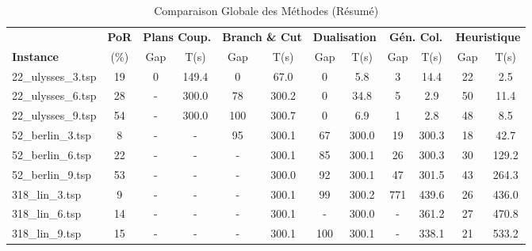 \begin{table}[H]
\centering
\caption{Comparaison Globale des Méthodes (Résumé)}
\scriptsize
\setlength{\tabcolsep}{3pt}
\begin{tabular}{|l|c||cc|cc|cc|cc|cc|}
\hline
 & \textbf{PoR} & \multicolumn{2}{c|}{\textbf{Plans Coup.}} & \multicolumn{2}{c|}{\textbf{Branch \& Cut}} & \multicolumn{2}{c|}{\textbf{Dualisation}} & \multicolumn{2}{c|}{\textbf{Gén. Col.}} & \multicolumn{2}{c|}{\textbf{Heuristique}} \\
\textbf{Instance} & (\%) & Gap & T(s) & Gap & T(s) & Gap & T(s) & Gap & T(s) & Gap & T(s) \\
\hline
22\_ulysses\_3.tsp & 19 & 0 & 149.4 & 0 & 67.0 & 0 & 5.8 & 3 & 14.4 & 22 & 2.5 \\
22\_ulysses\_6.tsp & 28 & - & 300.0 & 78 & 300.2 & 0 & 34.8 & 5 & 2.9 & 50 & 11.4 \\
22\_ulysses\_9.tsp & 54 & - & 300.0 & 100 & 300.7 & 0 & 6.9 & 1 & 2.8 & 48 & 8.5 \\
52\_berlin\_3.tsp & 8 & - & - & 95 & 300.1 & 67 & 300.0 & 19 & 300.3 & 18 & 42.7 \\
52\_berlin\_6.tsp & 22 & - & - & - & 300.1 & 85 & 300.1 & 26 & 300.3 & 30 & 129.2 \\
52\_berlin\_9.tsp & 53 & - & - & - & 300.0 & 92 & 300.1 & 47 & 301.5 & 43 & 264.3 \\
318\_lin\_3.tsp & 9 & - & - & - & 300.1 & 99 & 300.2 & 771 & 439.6 & 26 & 436.0 \\
318\_lin\_6.tsp & 14 & - & - & - & 300.1 & - & 300.0 & - & 361.2 & 27 & 470.8 \\
318\_lin\_9.tsp & 15 & - & - & - & 300.1 & 100 & 300.1 & - & 338.1 & 21 & 533.2 \\
\hline
\end{tabular}
\end{table}
